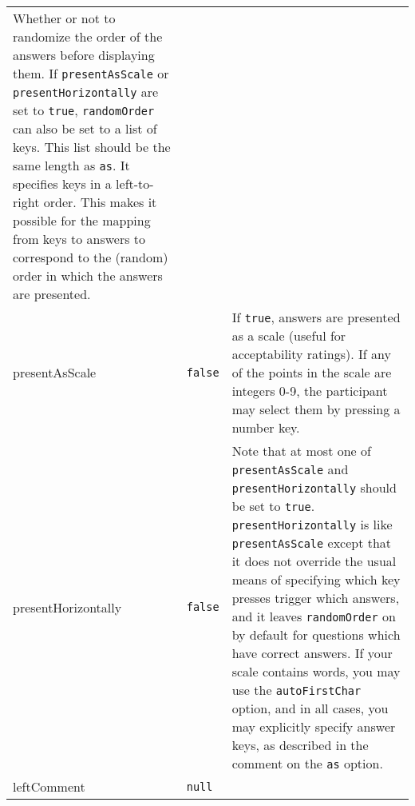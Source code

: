\documentclass[
]{article}
\begin{document}
\begin{RaggedRight}
\begin{longtable}[]{p{1.7in}p{1in}p{3.15in}}
\begin{minipage}[t]{0.61\columnwidth}
Whether or not to randomize the order of the answers before displaying
them. If \texttt{presentAsScale} or \texttt{presentHorizontally} are set
to \texttt{true}, \texttt{randomOrder} can also be set to a list of
keys. This list should be the same length as \texttt{as}. It specifies
keys in a left-to-right order. This makes it possible for the mapping
from keys to answers to correspond to the (random) order in which the
answers are presented.\strut
\end{minipage}\tabularnewline
\begin{minipage}[t]{0.16\columnwidth}\raggedright
presentAsScale\strut
\end{minipage} & \begin{minipage}[t]{0.14\columnwidth}\raggedright
\texttt{false}\strut
\end{minipage} & \begin{minipage}[t]{0.61\columnwidth}\raggedright
If \texttt{true}, answers are presented as a scale (useful for
acceptability ratings). If any of the points in the scale are integers
0-9, the participant may select them by pressing a number key.\strut
\end{minipage}\tabularnewline
\begin{minipage}[t]{0.16\columnwidth}\raggedright
presentHorizontally\strut
\end{minipage} & \begin{minipage}[t]{0.14\columnwidth}\raggedright
\texttt{false}\strut
\end{minipage} & \begin{minipage}[t]{0.61\columnwidth}\raggedright
Note that at most one of \texttt{presentAsScale} and
\texttt{presentHorizontally} should be set to \texttt{true}.
\texttt{presentHorizontally} is like \texttt{presentAsScale} except that
it does not override the usual means of specifying which key presses
trigger which answers, and it leaves \texttt{randomOrder} on by default
for questions which have correct answers. If your scale contains words,
you may use the \texttt{autoFirstChar} option, and in all cases, you may
explicitly specify answer keys, as described in the comment on the
\texttt{as} option.\strut
\end{minipage}\tabularnewline
\begin{minipage}[t]{0.16\columnwidth}\raggedright
leftComment\strut
\end{minipage} & \begin{minipage}[t]{0.14\columnwidth}\raggedright
\texttt{null}\strut
\end{minipage} & \begin{minipage}[t]{0.61\columnwidth}\raggedright

\end{minipage}
\end{longtable}
\end{RaggedRight}
\end{document}
